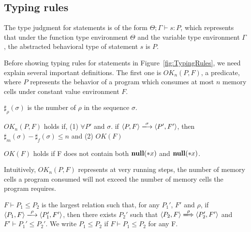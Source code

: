 \subsection{Typing rules}
The type judgment for statements is of the form \(\Theta; \Gamma
\vdash s : P \), which represents that under the function type
environment \(\Theta\) and the variable type environment \(\Gamma\),
the abstracted behavioral type of statement \(s\) is \(P\).

Before showing typing rules for statements in
Figure~\ref{fig:TypingRules}, we need explain several important
definitions. The first one is \(OK_n(P, F)\), a predicate, where \(P\)
represents the behavior of a program which consumes at most \(n\)
memory cells under constant value environment \(F\).

\begin{myDef}[\(\sharp_{\rho}(\sigma)\)]
\label{df:sharf}
\(\sharp_{\rho}(\sigma)\) is the number of \(\rho\) in the sequence
\(\sigma\).
\end{myDef}



\begin{myDef}
\label{df:okn}
\(OK_{n}(P, F)\) holds if, (1) \( \forall P'\) and \(\sigma\). if \( \langle P, F \rangle
\xlongrightarrow{\sigma} \langle P', F' \rangle \), then \( \sharp_m(\sigma) - \sharp_f(\sigma) \le n\) and (2) \( OK(F) \)
\end{myDef}

\begin{myDef}
\label{df:okf}
\(OK(F)\) holds if F does not contain both \( \mathbf{null}(*x) \) and \( \mathbf{null}(*x) \).
\end{myDef}

Intuitively, \(OK_n(P, F)\) represents at very running steps, the
number of memory cells a program consumed will not exceed the number
of memory cells the program requires.

\begin{myDef}[Subtyping]
\( F\vdash P_1 \le P_2\) is the largest relation such that, for any
\(P_1'\), \(F'\) and \(\rho\), if \( \langle P_1, F \rangle
\xlongrightarrow{\rho} \langle P_1', F' \rangle \), then there exists
\(P_2'\) such that \( \langle P_2, F \rangle \xLongrightarrow{\rho}
\langle P_2', F' \rangle \) and \( F'\vdash P_1' \le P_2'\).  We write
\( P_1 \le P_2\) if \(F\vdash P_1 \le P_2\) for any F.
\label{df:subtype}
\end{myDef}

